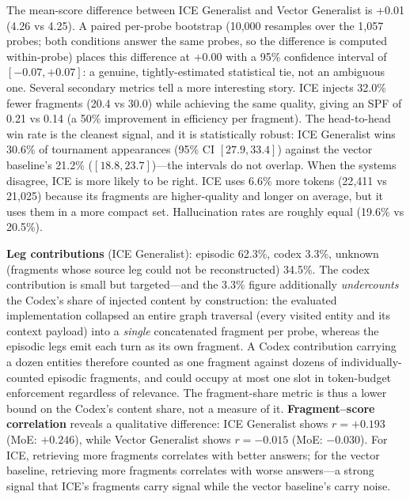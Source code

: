 \documentclass[10pt]{article}
\begin{document}
The mean-score difference between ICE Generalist and Vector Generalist is +0.01 (4.26 vs 4.25). A paired per-probe bootstrap (10{,}000 resamples over the 1{,}057 probes; both conditions answer the same probes, so the difference is computed within-probe) places this difference at $+0.00$ with a 95\% confidence interval of $[-0.07, +0.07]$: a genuine, tightly-estimated statistical tie, not an ambiguous one. Several secondary metrics tell a more interesting story. ICE injects 32.0\% fewer fragments (20.4 vs 30.0) while achieving the same quality, giving an SPF of 0.21 vs 0.14 (a 50\% improvement in efficiency per fragment). The head-to-head win rate is the cleanest signal, and it is statistically robust: ICE Generalist wins 30.6\% of tournament appearances (95\% CI $[27.9, 33.4]$) against the vector baseline's 21.2\% ($[18.8, 23.7]$)---the intervals do not overlap. When the systems disagree, ICE is more likely to be right. ICE uses 6.6\% more tokens (22{,}411 vs 21{,}025) because its fragments are higher-quality and longer on average, but it uses them in a more compact set. Hallucination rates are roughly equal (19.6\% vs 20.5\%).

\textbf{Leg contributions} (ICE Generalist): episodic 62.3\%, codex 3.3\%, unknown (fragments whose source leg could not be reconstructed) 34.5\%. The codex contribution is small but targeted---and the 3.3\% figure additionally \emph{undercounts} the Codex's share of injected content by construction: the evaluated implementation collapsed an entire graph traversal (every visited entity and its context payload) into a \emph{single} concatenated fragment per probe, whereas the episodic legs emit each turn as its own fragment. A Codex contribution carrying a dozen entities therefore counted as one fragment against dozens of individually-counted episodic fragments, and could occupy at most one slot in token-budget enforcement regardless of relevance. The fragment-share metric is thus a lower bound on the Codex's content share, not a measure of it. \textbf{Fragment--score correlation} reveals a qualitative difference: ICE Generalist shows $r = +0.193$ (MoE: $+0.246$), while Vector Generalist shows $r = -0.015$ (MoE: $-0.030$). For ICE, retrieving more fragments correlates with better answers; for the vector baseline, retrieving more fragments correlates with worse answers---a strong signal that ICE's fragments carry signal while the vector baseline's carry noise.
\end{document}
